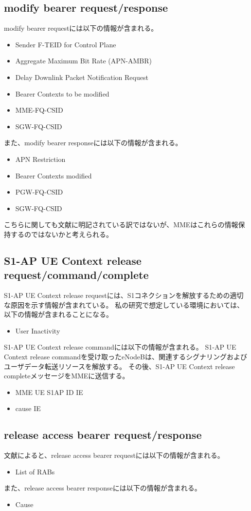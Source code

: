 \documentclass[a4j]{ujarticle}
\begin{document}
\subsection{modify bearer request/response}
modify bearer requestには以下の情報が含まれる。
\begin{itemize}
  \item Sender F-TEID for Control Plane
  \item Aggregate Maximum Bit Rate (APN-AMBR)
  \item Delay Downlink Packet Notification Request
  \item Bearer Contexts to be modified
  \item MME-FQ-CSID
  \item SGW-FQ-CSID
\end{itemize}
また、modify bearer responseには以下の情報が含まれる。
\begin{itemize}
  \item APN Restriction
  \item Bearer Contexts modified
  \item PGW-FQ-CSID
  \item SGW-FQ-CSID
\end{itemize}
こちらに関しても文献に明記されている訳ではないが、MMEはこれらの情報保持するのではないかと考えられる。
\subsection{S1-AP UE Context release request/command/complete}
S1-AP UE Context release requestには、S1コネクションを解放するための適切な原因を示す情報が含まれている。
私の研究で想定している環境においては、以下の情報が含まれることになる。
\begin{itemize}
  \item User Inactivity
\end{itemize}
S1-AP UE Context release commandには以下の情報が含まれる。
S1-AP UE Context release commandを受け取ったeNodeBは、関連するシグナリングおよびユーザデータ転送リソースを解放する。
その後、S1-AP UE Context release completeメッセージをMMEに送信する。
\begin{itemize}
  \item MME UE S1AP ID IE
  \item cause IE
\end{itemize}

\subsection{release access bearer request/response}
文献\cite{3gpp.29.274}によると、release access bearer requestには以下の情報が含まれる。
\begin{itemize}
  \item List of RABs
\end{itemize}
また、release access bearer responseには以下の情報が含まれる。
\begin{itemize}
  \item Cause
\end{itemize}
\end{document}
